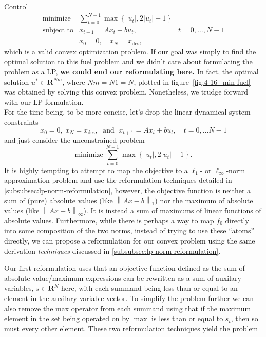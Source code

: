 \begin{chapter}{Control}
    \[\begin{array}{lll}
        \text{minimize} \; & \sum_{t=0}^{N-1} \max \left\{ \left| u_t \right|, 2 \left| u_t \right| - 1 \right\} & \\
        \text{subject to} & x_{t+1} = Ax_t + bu_t, \; & t=0, \ldots, N-1 \\
        & x_0 = 0, \quad x_{N} = x_{\text{des}},
        \end{array}\]
    which is a valid convex optimization problem. If our goal was
    simply to find the optimal solution to this fuel problem and we didn't care about 
    formulating the problem as a LP, \textbf{we could end our reformulating here.} In fact,
    the optimal solution $u^* \in \mathbf{R}^{Nm}$, where $Nm = N1 = N$, plotted in figure~\ref{fig:4-16_min-fuel}
    was obtained by solving this convex problem. 
    Nonetheless, we trudge forward with our LP formulation.\\
    For the time being, to be more concise, let's drop the linear dynamical system constraints
    \[x_0 = 0, \; x_N = x_{\text{des}}, \; \text{ and } \; x_{t+1} = Ax_t + bu_t, \quad t = 0, \ldots N-1\]
    and just consider the unconstrained problem
    \[\text{minimize} \; \sum_{t=0}^{N-1} \max \left\{ \left| u_t \right|, 2 \left| u_t \right| - 1 \right\}.\]
    It is highly tempting to attempt to map the objective to a $\ell_1$- or $\ell_\infty$-norm
    approximation problem and use the reformulation techniques detailed in \hyperref[subsubsec:lp-norm-reformulation]{\ref{subsubsec:lp-norm-reformulation}},
    however, the objective function is neither a sum of (pure) absolute values (like $\left\lVert Ax - b \right\rVert_{1}$)
    nor the maximum of absolute values (like $\left\lVert Ax - b \right\rVert_{\infty}$).
    It is instead a sum of maximums of linear functions of absolute values.
    Furthermore, while there is perhaps a way to map $f_0$ directly into some composition of the two norms,
    instead of trying to use these ``atoms'' directly, we can propose a reformulation
    for our convex problem using the same derivation \textit{techniques} discussed in \hyperref[subsubsec:lp-norm-reformulation]{\ref{subsubsec:lp-norm-reformulation}}.

    Our first reformulation uses that an objective function defined as the sum of absolute value/maximum expressions can be rewritten
    as a sum of auxilary variables, $s \in \mathbf{R}^N$ here, with each summand being less than
    or equal to an element in the auxilary variable vector. To simplify the problem further we can also 
    remove the max operator from each summand using that if the maximum element in the set
    being operated on by $\max$ is less than or equal to $s_t$, then so must every other element.
    These two reformulation techniques yield the problem


\end{chapter}
